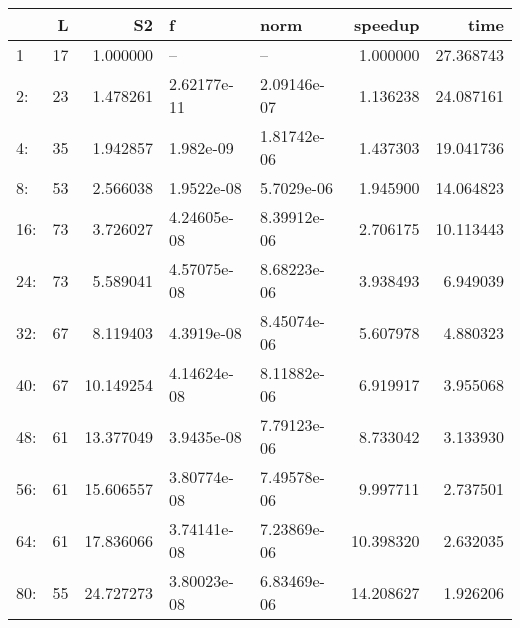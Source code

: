 \begin{tabular}{lrrllrr}
\toprule
{} &   L &         S2 &            f &         norm &    speedup &       time \\
\midrule
1   &  17 &   1.000000 &           -- &           -- &   1.000000 &  27.368743 \\
2:  &  23 &   1.478261 &  2.62177e-11 &  2.09146e-07 &   1.136238 &  24.087161 \\
4:  &  35 &   1.942857 &    1.982e-09 &  1.81742e-06 &   1.437303 &  19.041736 \\
8:  &  53 &   2.566038 &   1.9522e-08 &   5.7029e-06 &   1.945900 &  14.064823 \\
16: &  73 &   3.726027 &  4.24605e-08 &  8.39912e-06 &   2.706175 &  10.113443 \\
24: &  73 &   5.589041 &  4.57075e-08 &  8.68223e-06 &   3.938493 &   6.949039 \\
32: &  67 &   8.119403 &   4.3919e-08 &  8.45074e-06 &   5.607978 &   4.880323 \\
40: &  67 &  10.149254 &  4.14624e-08 &  8.11882e-06 &   6.919917 &   3.955068 \\
48: &  61 &  13.377049 &   3.9435e-08 &  7.79123e-06 &   8.733042 &   3.133930 \\
56: &  61 &  15.606557 &  3.80774e-08 &  7.49578e-06 &   9.997711 &   2.737501 \\
64: &  61 &  17.836066 &  3.74141e-08 &  7.23869e-06 &  10.398320 &   2.632035 \\
80: &  55 &  24.727273 &  3.80023e-08 &  6.83469e-06 &  14.208627 &   1.926206 \\
\bottomrule
\end{tabular}
